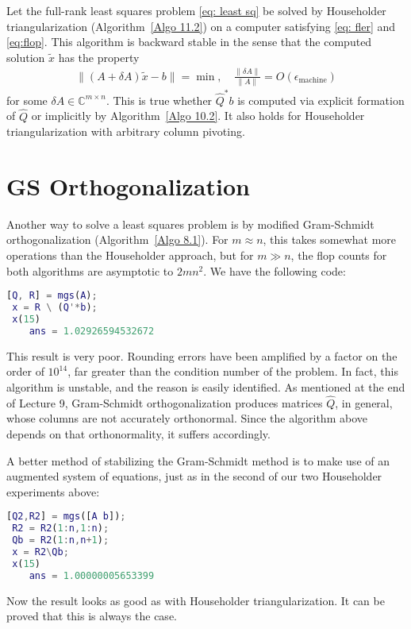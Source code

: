 \begin{theorem}
\label{thm: Backstap of Householder for LS}
Let the full-rank least squares problem \eqref{eq: least sq} be solved by Householder triangularization (Algorithm~\ref{Algo 11.2}) on a computer satisfying \eqref{eq: fler} and \eqref{eq:flop}. This algorithm is backward stable in the sense that the computed solution $\tilde{x}$ has the property
\begin{align}
    \label{eq: backstap of LS}
\|(A+\delta A) \tilde{x}-b\|=\min , \quad \frac{\|\delta A\|}{\|A\|}=O\left(\epsilon_{\text {machine}}\right)
\end{align}
for some $\delta A \in \mathbb{C}^{m \times n}$. This is true whether $\hat{Q}^* b$ is computed via explicit formation of $\hat{Q}$ or implicitly by Algorithm~\ref{Algo 10.2}. It also holds for Householder triangularization with arbitrary column pivoting.
\end{theorem}

\section{GS Orthogonalization}
Another way to solve a least squares problem is by modified Gram-Schmidt orthogonalization (Algorithm~\ref{Algo 8.1}). For $m \approx n$, this takes somewhat more operations than the Householder approach, but for $m \gg n$, the flop counts for both algorithms are asymptotic to $2 m n^2$. We have the following code: 

\begin{lstlisting}[language=Matlab]
 [Q, R] = mgs(A);
 x = R \ (Q'*b);
 x(15)
    ans = 1.02926594532672
\end{lstlisting}
This result is very poor. Rounding errors have been amplified by a factor on the order of $10^{14}$, far greater than the condition number of the problem. In fact, this algorithm is unstable, and the reason is easily identified. As mentioned at the end of Lecture 9, Gram-Schmidt orthogonalization produces matrices $\hat{Q}$, in general, whose columns are not accurately orthonormal. Since the algorithm above depends on that orthonormality, it suffers accordingly.

A better method of stabilizing the Gram-Schmidt method is to make use of an augmented system of equations, just as in the second of our two Householder experiments above:
\begin{lstlisting}[language=Matlab]
 [Q2,R2] = mgs([A b]); 
 R2 = R2(1:n,1:n);
 Qb = R2(1:n,n+1);
 x = R2\Qb;
 x(15)
    ans = 1.00000005653399
\end{lstlisting}
Now the result looks as good as with Householder triangularization. It can be proved that this is always the case.


